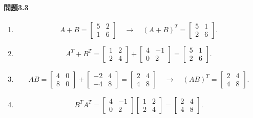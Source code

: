 \paragraph{問題3.3}
\begin{enumerate}[label=(\arabic*)]
    \item \[
        A+B = \begin{bmatrix}
            5 & 2 \\ 1 & 6
        \end{bmatrix}\quad \longrightarrow \quad
        (A+B)^T = \begin{bmatrix}
            5 & 1 \\ 2 & 6
        \end{bmatrix}.\]
    \item \[
        A^T + B^T =
        \begin{bmatrix}
            1 & 2 \\ 2 & 4
        \end{bmatrix}+
        \begin{bmatrix}
            4 & -1 \\ 0 & 2
        \end{bmatrix}=
        \begin{bmatrix}
            5 & 1 \\ 2 & 6
        \end{bmatrix}.
    \]
    \item \begin{align*}
        AB =
        \begin{bmatrix}
            4 & 0 \\ 8 & 0
        \end{bmatrix}+
        \begin{bmatrix}
            -2 & 4 \\ -4 & 8
        \end{bmatrix}=
        \begin{bmatrix}
            2 & 4 \\ 4 & 8
        \end{bmatrix}
        \quad \longrightarrow \quad
        (AB)^T =
        \begin{bmatrix}
            2 & 4 \\ 4 & 8
        \end{bmatrix}.
    \end{align*}
    \item \[
    B^TA^T =  \begin{bmatrix}
            4 & -1 \\ 0 & 2
        \end{bmatrix}\begin{bmatrix}
            1 & 2 \\ 2 & 4
        \end{bmatrix}=\begin{bmatrix}
            2 & 4 \\ 4 & 8
        \end{bmatrix}. \]
\end{enumerate}
\newpage